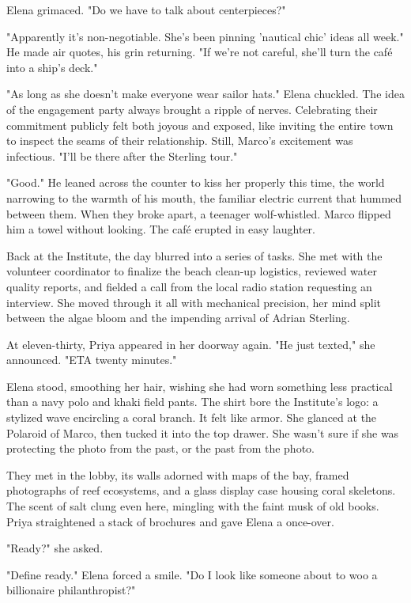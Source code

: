 Elena grimaced. "Do we have to talk about centerpieces?"

"Apparently it's non-negotiable. She's been pinning 'nautical chic' ideas all week." He made air quotes, his grin returning. "If we're not careful, she'll turn the café into a ship's deck."

"As long as she doesn't make everyone wear sailor hats." Elena chuckled. The idea of the engagement party always brought a ripple of nerves. Celebrating their commitment publicly felt both joyous and exposed, like inviting the entire town to inspect the seams of their relationship. Still, Marco's excitement was infectious. "I'll be there after the Sterling tour."

"Good." He leaned across the counter to kiss her properly this time, the world narrowing to the warmth of his mouth, the familiar electric current that hummed between them. When they broke apart, a teenager wolf-whistled. Marco flipped him a towel without looking. The café erupted in easy laughter.

Back at the Institute, the day blurred into a series of tasks. She met with the volunteer coordinator to finalize the beach clean-up logistics, reviewed water quality reports, and fielded a call from the local radio station requesting an interview. She moved through it all with mechanical precision, her mind split between the algae bloom and the impending arrival of Adrian Sterling.

At eleven-thirty, Priya appeared in her doorway again. "He just texted," she announced. "ETA twenty minutes."

Elena stood, smoothing her hair, wishing she had worn something less practical than a navy polo and khaki field pants. The shirt bore the Institute's logo: a stylized wave encircling a coral branch. It felt like armor. She glanced at the Polaroid of Marco, then tucked it into the top drawer. She wasn't sure if she was protecting the photo from the past, or the past from the photo.

They met in the lobby, its walls adorned with maps of the bay, framed photographs of reef ecosystems, and a glass display case housing coral skeletons. The scent of salt clung even here, mingling with the faint musk of old books. Priya straightened a stack of brochures and gave Elena a once-over.

"Ready?" she asked.

"Define ready." Elena forced a smile. "Do I look like someone about to woo a billionaire philanthropist?"

